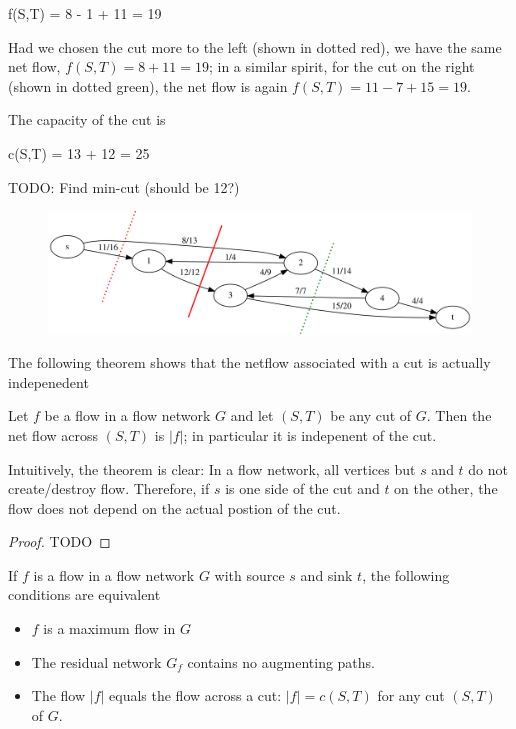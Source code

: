 \bee
f(S,T) = 8 - 1 + 11 = 19 
\eee

Had we chosen the cut more to the left (shown in dotted red), we have the same net flow, $f(S,T) = 8 + 11 = 19$; in a similar spirit, for the cut on the right (shown in dotted green), the net flow is again $f(S,T) = 11 - 7 + 15 = 19$.

The capacity of the cut is

\bee
c(S,T) = 13 + 12 = 25
\eee

TODO: Find min-cut (should be 12?)


\begin{figure}[H] \centering
\includegraphics[scale=0.6]{images/max_flow_03.png}
\end{figure}


The following theorem shows that the netflow associated with a cut is actually indepenedent 

\begin{theorem}
  Let $f$ be a flow in a flow network $G$ and let $(S,T)$ be any cut of $G$. Then the net flow across $(S,T)$ is $|f|$; in particular it is indepenent of the cut.
\end{theorem}

Intuitively, the theorem is clear: In a flow network, all vertices but $s$ and $t$ do not create/destroy flow. Therefore, if $s$ is one side of the cut and $t$ on the other, the flow does not depend on the actual postion of the cut. 

\begin{proof}
  TODO
\end{proof}

\begin{theorem}
  If $f$ is a flow in a flow network $G$ with source $s$ and sink $t$, the following conditions are equivalent
  \begin{itemize}
  \item $f$ is a maximum flow in $G$
  \item The residual network $G_f$ contains no augmenting paths.
  \item The flow $|f|$ equals the flow across a cut: $|f| = c(S,T)$ for any cut $(S,T)$ of $G$.
  \end{itemize}
\end{theorem}

